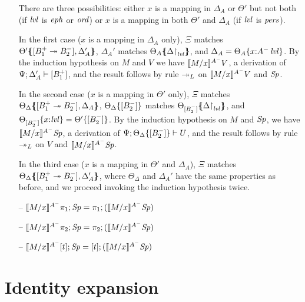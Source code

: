 \begin{itemize}
  There are three possibilities: either $x$ is a mapping in 
  $\Delta_A$ or $\Theta'$  but not both (if $\mlvl$ is $\meph$
  or $\mtrue$) or $x$ is a mapping in both $\Theta'$ and $\Delta_A$
  (if $\mlvl$ is $\mpers$). 

  In the first case ($x$ is a mapping in $\Delta_A$ only), 
  $\Xi$ matches 
  $\frameoff{\Theta'}{\matchconj{[B_1^+ \righti B_2^-]}{\Delta_A'}}$,
  $\Delta_A'$ matches $\frameoff{\Theta_A}{\restrictto{\Delta}{\mlvl}}$, and 
  $\Delta_A = \tackon{\Theta_A}{x{:}\islvl{A^-}}$. 
  By the induction hypothesis on $M$ and $V$ we have
  $\rsubsta{M}{x}{V}{A^-}$, a derivation of $\foc{\Psi}{\Delta'_A}{[B_1^+]}$,
  and the result follows by rule ${\righti}_L$ on 
  $\rsubsta{M}{x}{V}{A^-}$ and $\Sp$.

  In the second case ($x$ is a mapping in $\Theta'$ only),
  $\Xi$ matches 
  $\frameoff{\Theta_\Delta}{\matchconj{[B_1^+ \righti B_2^-]}{\Delta_A}}$,
  $\tackon{\Theta_\Delta}{[B_2^-]}$ matches
  $\frameoff{\Theta_{[B_2^-]}}{\restrictto{\Delta}{\mlvl}}$,
  and  
  $\tackon{\Theta_{[B_2^-]}}{x{:}\mlvl} = \tackon{\Theta'}{[B_2^-]}$.
  By the induction hypothesis on $M$ and $\Sp$, we have 
  $\rsubsta{M}{x}{\Sp}{A^-}$, a derivation of 
  $\foc{\Psi}{\tackon{\Theta_\Delta}{[B_2^-]}}{U}$, and the result follows
  by rule ${\righti}_L$ on $V$ and $\rsubsta{M}{x}{\Sp}{A^-}$.

  In the third case ($x$ is a mapping in $\Theta'$ and $\Delta_A$), 
  $\Xi$ matches 
  $\frameoff{\Theta_\Delta}{\matchconj{[B_1^+ \righti B_2^-]}{\Delta_A'}}$,
  where $\Theta_\Delta$ and $\Delta_A'$ have the same properties as before,
  and we proceed invoking the induction hypothesis twice.

\smallskip
  
\item[--] $\rsubsta{M}{x}{\tpione{\Sp}}{A^-} 
           = \tpione{(\rsubsta{M}{x}{\Sp}{A^-})}$
\item[--] $\rsubsta{M}{x}{\tpitwo{\Sp}}{A^-} 
           = \tpitwo{(\rsubsta{M}{x}{\Sp}{A^-})}$
\item[--] $\rsubsta{M}{x}{\tforalll{t}{\Sp}}{A^-} 
           = \tforalll{t}{(\rsubsta{M}{x}{\Sp}{A^-})}$
\end{itemize}

\section{Identity expansion}
\label{sec:ord-identity}

